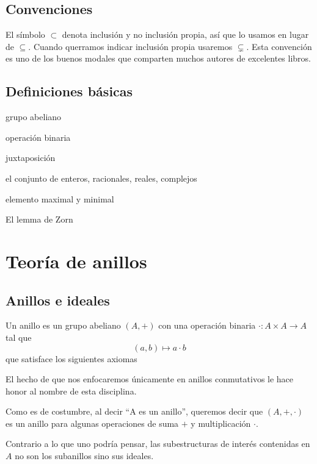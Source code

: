 \documentclass[b5paper,10pt]{book}
\begin{document}
\section{Convenciones}

El símbolo \(\subset\) denota inclusión y no inclusión propia,
así que lo usamos en lugar de \(\subseteq\).
Cuando querramos indicar inclusión propia usaremos \(\subsetneq\).	
Esta convención es uno de los buenos modales
que comparten muchos autores de excelentes libros.


\section{Definiciones básicas}

\begin{defi}
grupo abeliano
\end{defi}

\begin{defi}
operación binaria
\end{defi}
juxtaposición

el conjunto de enteros, racionales, reales, complejos

elemento maximal y minimal

El lemma de Zorn
\chapter{Teoría de anillos}
\section{Anillos e ideales}



\begin{defi}
Un anillo es un grupo abeliano \((A,+)\) con una operación binaria
\(\cdot : A\times A\to A\) tal que
\[
	(a,b)\mapsto a\cdot b
\]
que satisface los siguientes axiomas
\end{defi}

El hecho de que nos enfocaremos únicamente
en anillos conmutativos le hace honor al nombre de 
esta disciplina.

Como es de costumbre, al decir 
``A es un anillo'', 
queremos decir que 
\((A,+,\cdot)\) es un anillo
para algunas operaciones de suma \(+\) y multiplicación \(\cdot\).

Contrario a lo que uno podría pensar,
las subestructuras de interés contenidas en \(A\)
no son los subanillos sino sus ideales.
\end{document}

